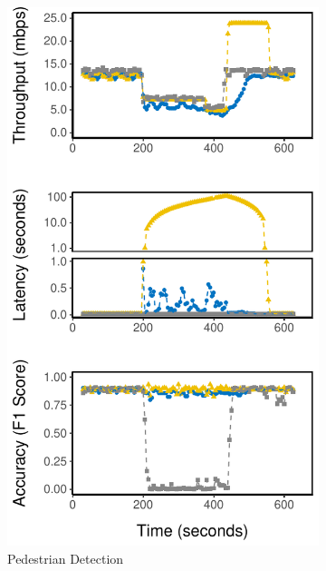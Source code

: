 \begin{figure}
  \begin{subfigure}{0.3\textwidth}
    \centering
    \includegraphics[width=\textwidth]{figures/runtime-mot-verticle.pdf}
    \caption{Pedestrian Detection}
    \label{fig:pd-runtime}
  \end{subfigure}
  \hfill
  \begin{subfigure}{0.3\textwidth}
    \centering

\end{subfigure}
\end{figure}
